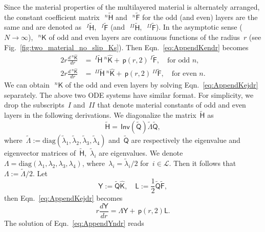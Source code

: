\documentclass[preprint,10pt,times]{elsarticle}
\numberwithin{equation}{section}
\renewcommand{\u}[1]{\boldsymbol{#1}}
\newcommand{\usf}[1]{\u{\mathsf #1}}
\newcommand{\pr}[1]{\left( #1 \right)}
\newcommand{\p}{\,\mathsf{p}}
\newcommand{\Inv}{\,\mathsf{Inv}}
\renewcommand{\>}{$\Rightarrow$}
\begin{document}
Since the material properties of the multilayered material is alternately arranged, the constant coefficient matrix~$~^{n}\tilde{\usf{H}}$ and~$~^{n}\tilde{\usf{F}}$ for the odd (and even) layers are the same and are denoted as~$~^{I}\tilde{\usf{H}}$,~$~^{I}\tilde{\usf{F}}$ (and~$~^{II}\tilde{\usf{H}}$,~$~^{II}\tilde{\usf{F}}$). In the asymptotic sense ($N \to \infty$),~$~^{n}{\usf{K}}$ of odd and even layers are continuous functions of the radius~$r$ (see Fig.~\ref{fig:two_material_no_slip_Ks}). Then Eqn.~\eqref{eq:AppendKendr} becomes
\begin{subequations}
\begin{align}
	2 r \frac{d~^{n}{\hat{\usf{K}}}}{dr} & = ~^{I}\tilde{\usf{H}} ~^{n}{\hat{\usf{K}}} + \p\pr{r,2} ~^{I}\tilde{\usf{F}}, \quad \text{for odd~$n$}, \\
	2 r \frac{d~^{n}{\hat{\usf{K}}}}{dr} & = ~^{II}\tilde{\usf{H}} ~^{n}{\hat{\usf{K}}} + \p\pr{r,2} ~^{II}\tilde{\usf{F}}, \quad \text{for even~$n$}.
\end{align}
\label{eq:AppendKejdr}
\end{subequations}
We can obtain~$~^{n}{\usf{K}}$ of the odd and even layers by solving Eqn.~\eqref{eq:AppendKejdr} separately. The above two ODE systems have similar format. For simplicity, we drop the subscripts~$I$ and~$II$ that denote material constants of odd and even layers in the following derivations. We diagonalize the matrix~$\tilde{\usf{H}}$ as
\begin{equation}
    \tilde{\usf{H}} = \Inv\pr{\tilde{\usf{Q}}} \tilde{\usf{\Lambda}} \tilde{\usf{Q}},
\end{equation}
where~$\tilde{\usf{\Lambda}} := \text{diag}(\tilde{\lambda}_1,\tilde{\lambda}_2,\tilde{\lambda}_3,\tilde{\lambda}_4)$ and~$\tilde{\usf{Q}}$ are respectively the eigenvalue and eigenvector matrices of~$\tilde{\usf{H}}$,~$\tilde{\lambda}_i$ are eigenvalues. We denote~$\usf{\Lambda}= \text{diag}(\lambda_1,\lambda_2,\lambda_3,\lambda_4)$, where~$\lambda_i = \tilde{\lambda}_i/2$ for~$i \in \mathcal{L}$. Then it follows that~$\usf{\Lambda} := \tilde{\usf{\Lambda}}/2$.
Let
\begin{equation}
	\usf{Y} := \tilde{\usf{Q}} \hat{\usf{K}}, \quad \usf{L} := \frac{1}{2}\tilde{\usf{Q}} \tilde{\usf{F}},
\end{equation}
then Eqn.~\eqref{eq:AppendKejdr} becomes
\begin{equation}
	r \frac{d\usf{Y}}{dr} = \usf{\Lambda} \usf{Y} + \p\pr{r,2} \usf{L}.
	\label{eq:AppendYndr}
\end{equation}
The solution of Eqn.~\eqref{eq:AppendYndr} reads
\end{document}
